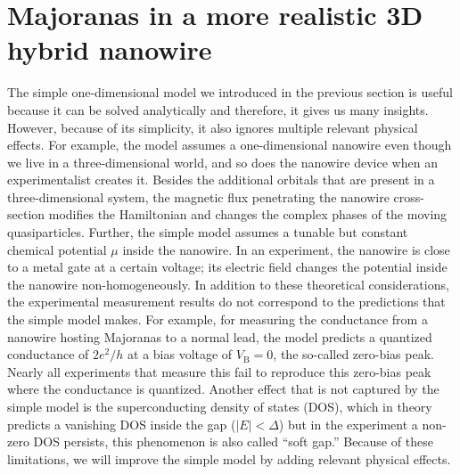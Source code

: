 \section{Majoranas in a more realistic 3D hybrid nanowire}\label{sec:realistic_nanowire}
The simple one-dimensional model we introduced in the previous section is useful because it can be solved analytically and therefore, it gives us many insights.
However, because of its simplicity, it also ignores multiple relevant physical effects.
For example, the model assumes a one-dimensional nanowire even though we live in a three-dimensional world, and so does the nanowire device when an experimentalist creates it.
Besides the additional orbitals that are present in a three-dimensional system, the magnetic flux penetrating the nanowire cross-section modifies the Hamiltonian and changes the complex phases of the moving quasiparticles.
Further, the simple model assumes a tunable but constant chemical potential $\mu$ inside the nanowire.
In an experiment, the nanowire is close to a metal gate at a certain voltage; its electric field changes the potential inside the nanowire non-homogeneously.
In addition to these theoretical considerations, the experimental measurement results do not correspond to the predictions that the simple model makes.
For example, for measuring the conductance from a nanowire hosting Majoranas to a normal lead, the model predicts a quantized conductance of $2 e^2/h$ at a bias voltage of $V_\textrm{B}=0$, the so-called zero-bias peak.
Nearly all experiments that measure this fail to reproduce this zero-bias peak where the conductance is quantized.  %
Another effect that is not captured by the simple model is the superconducting density of states (DOS), which in theory predicts a vanishing DOS inside the gap ($|E|<\Delta$) but in the experiment a non-zero DOS persists, this phenomenon is also called ``soft gap.''
Because of these limitations, we will improve the simple model by adding relevant physical effects.

